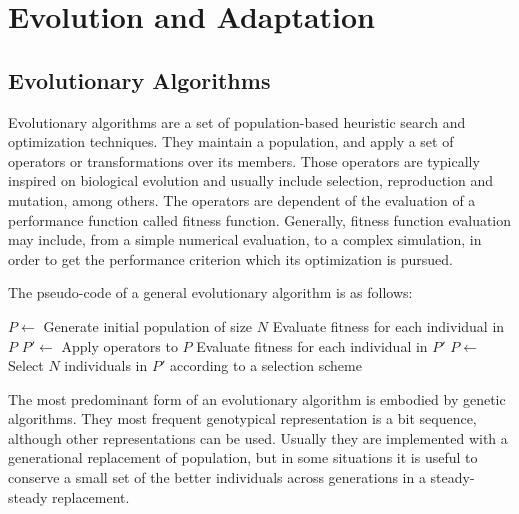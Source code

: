 \section{Evolution and Adaptation}
\subsection{Evolutionary Algorithms}
Evolutionary algorithms are a set of population-based heuristic search
and optimization techniques. They maintain a population, and apply a
set of operators or transformations over its members. Those operators
are typically inspired on biological evolution and usually include
selection, reproduction and mutation, among others. The operators are
dependent of the evaluation of a performance function called fitness
function. Generally, fitness function evaluation may include, from a
simple numerical evaluation, to a complex simulation, in order to get
the performance criterion which its optimization is pursued.

The pseudo-code of a general evolutionary algorithm is as follows:

\begin{algorithm}[h!]
  \caption{$Evolutionary Algorithm$}\label{alg:factorial}
  \begin{algorithmic}[1]
    \STATE $P \leftarrow$ Generate initial population of size $N$
    \STATE Evaluate fitness for each individual in $P$ \REPEAT \STATE
    $P' \leftarrow$ Apply operators to $P$ \STATE Evaluate fitness for
    each individual in $P'$ \STATE $P \leftarrow$ Select $N$
    individuals in $P'$ according to a selection scheme
  \end{algorithmic}
\end{algorithm}

The most predominant form of an evolutionary algorithm is embodied by
genetic algorithms. They most frequent genotypical representation is a
bit sequence, although other representations can be used. Usually they
are implemented with a generational replacement of population, but in
some situations it is useful to conserve a small set of the better
individuals across generations in a steady-steady replacement.




